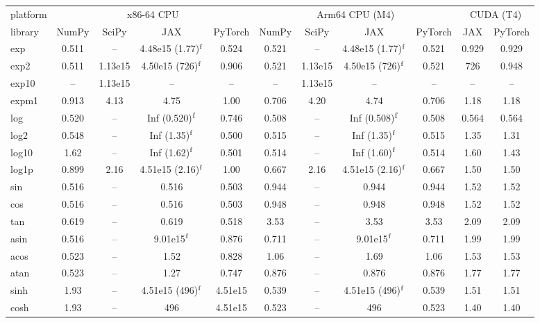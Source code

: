 \begin{table}
\centering
\begin{small}
\begin{tabular}{|l|cccc|cccc|cc|}
\hline
platform & \multicolumn{4}{c|}{x86-64 CPU} & \multicolumn{4}{c|}{Arm64 CPU (M4)} & \multicolumn{2}{c|}{CUDA (T4)} \\
library & NumPy & SciPy & JAX & PyTorch & NumPy & SciPy & JAX & PyTorch & JAX & PyTorch \\ \hline
exp & 0.511 & -- & 4.48e15 (1.77)$^{\rm f}$ & 0.524 & 0.521 & -- & 4.48e15 (1.77)$^{\rm f}$ & 0.521 & 0.929 & 0.929 \\
exp2 & 0.511 & 1.13e15 & 4.50e15 (726)$^{\rm f}$ & 0.906 & 0.521 & 1.13e15 & 4.50e15 (726)$^{\rm f}$ & 0.521 & 726 & 0.948 \\
exp10 & -- & 1.13e15 & -- & -- & -- & 1.13e15 & -- & -- & -- & -- \\
expm1 & 0.913 & 4.13 & 4.75 & 1.00 & 0.706 & 4.20 & 4.74 & 0.706 & 1.18 & 1.18 \\
log & 0.520 & -- & Inf (0.520)$^{\rm f}$ & 0.746 & 0.508 & -- & Inf (0.508)$^{\rm f}$ & 0.508 & 0.564 & 0.564 \\
log2 & 0.548 & -- & Inf (1.35)$^{\rm f}$ & 0.500 & 0.515 & -- & Inf (1.35)$^{\rm f}$ & 0.515 & 1.35 & 1.31 \\
log10 & 1.62 & -- & Inf (1.62)$^{\rm f}$ & 0.501 & 0.514 & -- & Inf (1.60)$^{\rm f}$ & 0.514 & 1.60 & 1.43 \\
log1p & 0.899 & 2.16 & 4.51e15 (2.16)$^{\rm f}$ & 1.00 & 0.667 & 2.16 & 4.51e15 (2.16)$^{\rm f}$ & 0.667 & 1.50 & 1.50 \\
sin & 0.516 & -- & 0.516 & 0.503 & 0.944 & -- & 0.944 & 0.944 & 1.52 & 1.52 \\
cos & 0.516 & -- & 0.516 & 0.503 & 0.948 & -- & 0.948 & 0.948 & 1.52 & 1.52 \\
tan & 0.619 & -- & 0.619 & 0.518 & 3.53 & -- & 3.53 & 3.53 & 2.09 & 2.09 \\
asin & 0.516 & -- & 9.01e15$^{\rm f}$ & 0.876 & 0.711 & -- & 9.01e15$^{\rm f}$ & 0.711 & 1.99 & 1.99 \\
acos & 0.523 & -- & 1.52 & 0.828 & 1.06 & -- & 1.69 & 1.06 & 1.53 & 1.53 \\
atan & 0.523 & -- & 1.27 & 0.747 & 0.876 & -- & 0.876 & 0.876 & 1.77 & 1.77 \\
sinh & 1.93 & -- & 4.51e15 (496)$^{\rm f}$ & 4.51e15 & 0.539 & -- & 4.51e15 (496)$^{\rm f}$ & 0.539 & 1.51 & 1.51 \\
cosh & 1.93 & -- & 496 & 4.51e15 & 0.523 & -- & 496 & 0.523 & 1.40 & 1.40 \\

\end{tabular}
\end{small}
\end{table}
